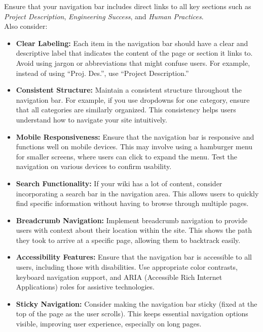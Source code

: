Ensure that your navigation bar includes direct links to all key sections such as \textit{Project Description}, \textit{Engineering Success}, and \textit{Human Practices}. \\ \newline
Also consider:
\begin{itemize}
\item \textbf{Clear Labeling:}
Each item in the navigation bar should have a clear and descriptive label that indicates the content of the page or section it links to.
Avoid using jargon or abbreviations that might confuse users.
For example, instead of using ``Proj. Des.'', use ``Project Description.''

\item \textbf{Consistent Structure:}
Maintain a consistent structure throughout the navigation bar.
For example, if you use dropdowns for one category, ensure that all categories are similarly organized.
This consistency helps users understand how to navigate your site intuitively.

\item \textbf{Mobile Responsiveness:}
Ensure that the navigation bar is responsive and functions well on mobile devices.
This may involve using a hamburger menu for smaller screens, where users can click to expand the menu.
Test the navigation on various devices to confirm usability.

\item \textbf{Search Functionality:}
If your wiki has a lot of content, consider incorporating a search bar in the navigation area.
This allows users to quickly find specific information without having to browse through multiple pages.

\item \textbf{Breadcrumb Navigation:}
Implement breadcrumb navigation to provide users with context about their location within the site.
This shows the path they took to arrive at a specific page, allowing them to backtrack easily.

\item \textbf{Accessibility Features:}
Ensure that the navigation bar is accessible to all users, including those with disabilities.
Use appropriate color contrasts, keyboard navigation support, and ARIA (Accessible Rich Internet Applications) roles for assistive technologies.

\item \textbf{Sticky Navigation:}
Consider making the navigation bar sticky (fixed at the top of the page as the user scrolls).
This keeps essential navigation options visible, improving user experience, especially on long pages.


\end{itemize}
